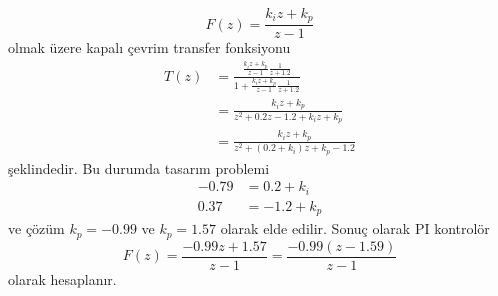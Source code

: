\begin{enumerate}[\bfseries S1.]
\begin{equation}
        F(z)=\frac{k_iz+k_p}{z-1}
    \end{equation}
    olmak üzere kapalı çevrim transfer fonksiyonu
    \begin{equation}
    \begin{split}
        T(z)&=\frac{\frac{k_iz+k_p}{z-1}\frac{1}{z+1.2}}{1+\frac{k_iz+k_p}{z-1}\frac{1}{z+1.2}}\\
        &=\frac{k_iz+k_p}{z^2+0.2z-1.2+k_iz+k_p}\\
        &=\frac{k_iz+k_p}{z^2+(0.2+k_i)z+k_p-1.2}
    \end{split}
    \end{equation}
    şeklindedir. Bu durumda tasarım problemi
    \begin{equation}
        \begin{split}
        -0.79 &= 0.2 + k_i\\
         0.37 &= -1.2 + k_p
        \end{split}
    \end{equation}
    ve çözüm $k_p=-0.99$ ve $k_p=1.57$ olarak elde edilir. Sonuç olarak PI kontrolör
    \begin{equation}
        F(z)=\frac{-0.99z+1.57}{z-1}=\frac{-0.99(z-1.59)}{z-1}
    \end{equation}
    olarak hesaplanır.


\end{enumerate}
